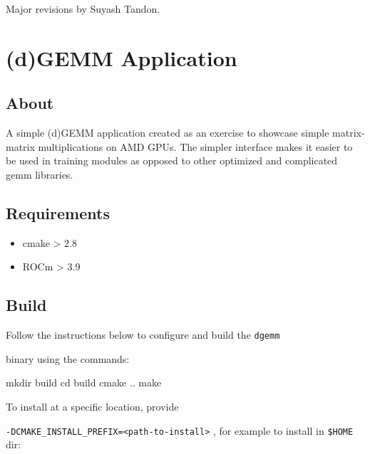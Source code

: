 \documentclass[
]{article}
\providecommand{\tightlist}{%
  \setlength{\itemsep}{0pt}\setlength{\parskip}{0pt}}
\let\oldtexttt\texttt
\renewcommand{\texttt}[1]{
  \colorbox{Light}{\oldtexttt{#1}}
}
\newenvironment{Shaded}{}{}
\newcommand{\BuiltInTok}[1]{#1}
\newcommand{\FunctionTok}[1]{\textcolor[rgb]{0.02,0.16,0.49}{#1}}
\newcommand{\NormalTok}[1]{#1}
\newcommand{\VariableTok}[1]{\textcolor[rgb]{0.10,0.09,0.49}{#1}}
\providecommand{\tightlist}{%
  \setlength{\itemsep}{0pt}\setlength{\parskip}{0pt}}
\begin{document}
Major revisions by Suyash Tandon.

\hypertarget{dgemm-application}{%
\section{(d)GEMM Application}\label{dgemm-application}}

\hypertarget{about}{%
\subsection{About}\label{about}}

A simple (d)GEMM application created as an exercise to showcase simple
matrix-matrix multiplications on AMD GPUs. The simpler interface makes
it easier to be used in training modules as opposed to other optimized
and complicated gemm libraries.

\hypertarget{requirements}{%
\subsection{Requirements}\label{requirements}}

\begin{itemize}
\tightlist
\item
  cmake \textgreater{} 2.8
\item
  ROCm \textgreater{} 3.9
\end{itemize}

\hypertarget{build}{%
\subsection{Build}\label{build}}

Follow the instructions below to configure and build the \texttt{dgemm}
binary using the commands:

\begin{Shaded}
\begin{Highlighting}[]
\FunctionTok{mkdir}\NormalTok{ build}
\BuiltInTok{cd}\NormalTok{ build}
\FunctionTok{cmake}\NormalTok{ ..}
\FunctionTok{make}
\end{Highlighting}
\end{Shaded}

To install at a specific location, provide
\texttt{-DCMAKE\_INSTALL\_PREFIX=\textless{}path-to-install\textgreater{}},
for example to install in \texttt{\$HOME} dir:

\begin{Shaded}
\end{Shaded}
\end{document}
